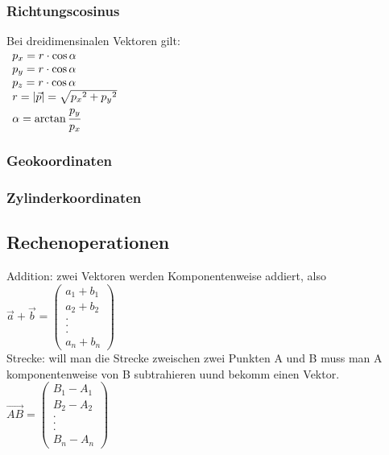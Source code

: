 \documentclass[a4paper,10pt]{scrartcl}
\begin{document}
            \subsubsection{Richtungscosinus}
                Bei dreidimensinalen Vektoren gilt: \\
                $\begin{array}{l}
                    p_x = r \cdot \cos \alpha \\
                    p_y = r \cdot \cos \alpha \\
                    p_z = r \cdot \cos \alpha \\
                    r = |\vec p| = \sqrt{{p_x}^2 + {p_y}^2} \\
                    \alpha = \arctan \cfrac{p_y}{p_x}
                \end{array}$
            \subsubsection{Geokoordinaten}
            \subsubsection{Zylinderkoordinaten}
        \subsection{Rechenoperationen}
            Addition: zwei Vektoren werden Komponentenweise addiert, also $\vec a + \vec b = 
            \begin{pmatrix}
                a_1 + b_1\\
                a_2 + b_2\\
                .\\
                .\\.\\
                a_n + b_n    
            \end{pmatrix} $\\
            Strecke: will man die Strecke zweischen zwei Punkten A und B muss man A komponentenweise von B subtrahieren uund bekomm einen Vektor. $\vec {AB} = 
            \begin{pmatrix}
                B_1 - A_1 \\
                B_2 - A_2\\
                .\\
                .\\.\\
                B_n - A_n  
            \end{pmatrix}$
\end{document}
